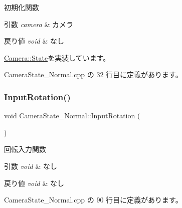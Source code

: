 初期化関数 


\begin{DoxyParams}{引数}
{\em camera} & カメラ \\
\hline
\end{DoxyParams}

\begin{DoxyRetVals}{戻り値}
{\em void} & なし \\
\hline
\end{DoxyRetVals}


\mbox{\hyperlink{class_camera_1_1_state_a11627f91e7dc5085d3cbb8841747a778}{Camera\+::\+State}}を実装しています。



 Camera\+State\+\_\+\+Normal.\+cpp の 32 行目に定義があります。

\mbox{\label{class_camera_state___normal_acaaa5e148b8ce2769a54fe13892ae3bd}} 
\subsubsection{\texorpdfstring{Input\+Rotation()}{InputRotation()}}
{\footnotesize\ttfamily void Camera\+State\+\_\+\+Normal\+::\+Input\+Rotation (\begin{DoxyParamCaption}{ }\end{DoxyParamCaption})\hspace{0.3cm}{\ttfamily [private]}}



回転入力関数 


\begin{DoxyParams}{引数}
{\em void} & なし \\
\hline
\end{DoxyParams}

\begin{DoxyRetVals}{戻り値}
{\em void} & なし \\
\hline
\end{DoxyRetVals}


 Camera\+State\+\_\+\+Normal.\+cpp の 90 行目に定義があります。

\mbox{\label{class_camera_state___normal_a8989cddf35141ae6b875393755479c4c}} 
